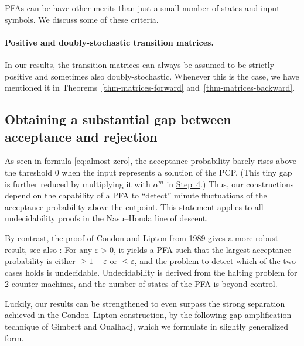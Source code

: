 \documentclass[a4paper,cleveref, autoref, thm-restate]{lipics-v2021}
\newif\ifanonymous
\newcommand\eps{\varepsilon}
\begin{document}
\fi


PFAs can be have other merits than just a small number of states
and input symbols. We discuss some of these criteria.

\paragraph{Positive and doubly-stochastic transition matrices.}
In our results,
the
 transition matrices can always be assumed to be
 strictly positive and 
 sometimes also
 doubly-stochastic.  Whenever this is the case,
 we have mentioned it in
 Theorems~\ref{thm-matrices-forward} and~\ref{thm-matrices-backward}.


\subsection{Obtaining a substantial gap between acceptance and rejection}
\label{sec:amplification}

As seen in formula
\eqref{eq:almost-zero}, the acceptance probability barely rises
above the threshold $0$ when the input represents a solution of the
PCP.
(This tiny gap is further reduced by multiplying it with
 $\alpha^m$ in
 \hyperref[sec:step4]{Step~4}.)
Thus, our constructions 
depend on the capability of a PFA to ``detect'' minute fluctuations
of the acceptance probability above the cutpoint.
This statement applies to all undecidability proofs in the Nasu--Honda
line of descent.

By contrast,
the proof of %
Condon and Lipton
\cite{condon-lipton-1989} from 1989
gives a more robust result\ifanonymous\else, see also %
\cite[Section~4]{r-pfaeu-24}\fi
:
 For any $\eps>0$, it yields a PFA
such that the largest acceptance probability is either $\ge 1-\eps$ or
$\le \eps$, and
the problem to detect which of the two cases holds is undecidable.
 Undecidability is derived from the halting problem for 2-counter
machines,
and the number of states of the PFA
is beyond control.

Luckily, our results can be strengthened to
 even surpass the strong separation achieved in the
Condon--Lipton construction, by the following
gap amplification technique of
Gimbert and Oualhadj, which
we formulate in slightly generalized form.
\end{document}
